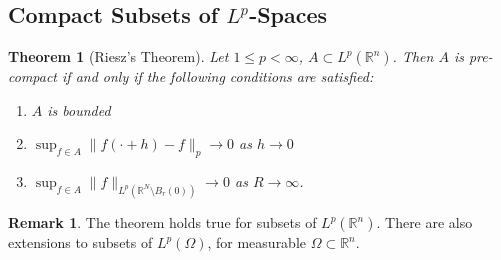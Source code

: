 \documentclass[11pt,a4paper]{article}
\newtheorem{thm}{Theorem}[section]
\theoremstyle{definition}
\newtheorem{rem}{Remark}[section]
\begin{document}
\subsection{Compact Subsets of $L^p$-Spaces}
\begin{thm}[Riesz's Theorem] Let $1 \leq p < \infty$, $A \subset L^p( \mathbb{R}^n)$. Then $A$ is pre-compact if and only if the following conditions are satisfied:
\begin{enumerate}
\item $A$ is bounded 
\item $\displaystyle \sup_{f \in A} \|f( \cdot + h) -f \|_p \to 0$ as $h \to 0$
\item $\displaystyle \sup_{f \in A} \|f\|_{L^p( \mathbb{R}^N \setminus B_r(0)) } \to 0$ as $R \to \infty$.
\end{enumerate}
\end{thm}
\begin{rem} The theorem holds true for subsets of $L^p( \mathbb{R}^n)$. There are also extensions to subsets of $L^p( \Omega)$, for measurable $\Omega \subset \mathbb{R}^n$. 
\end{rem}
\end{document}

